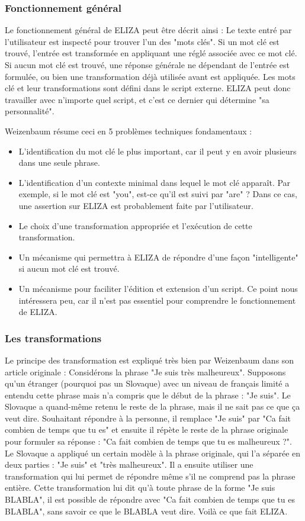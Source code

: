 \documentclass[11pt,a4paper]{report}
\begin{document}
  \subsubsection*{Fonctionnement général}
  Le fonctionnement général de ELIZA peut être décrit ainsi : Le texte entré par l'utilisateur 
  est inspecté pour trouver l'un des "mots clés". Si un mot clé est trouvé, l'entrée est transformée 
  en appliquant une réglé associée avec ce mot clé. Si aucun mot clé est trouvé, une réponse générale 
  ne dépendant de l'entrée est formulée, ou bien une transformation déjà utilisée avant est appliquée. 
  Les mots clé et leur transformations sont défini dans le script externe. ELIZA peut donc travailler 
  avec n'importe quel script, et c'est ce dernier qui détermine "sa personnalité". 

  Weizenbaum résume ceci en 5 problèmes techniques fondamentaux :
  \begin{itemize}
    \item L'identification du mot clé le plus important, car il peut y en avoir plusieurs dans une 
    seule phrase.
    \item L'identification d'un contexte minimal dans lequel le mot clé apparaît. Par exemple, si le 
    mot clé est "you", est-ce qu'il est suivi par "are" ? Dans ce cas, une assertion sur ELIZA est 
    probablement faite par l'utilisateur.
    \item Le choix d'une transformation appropriée et l'exécution de cette transformation. 
    \item Un mécanisme qui permettra à ELIZA de répondre d'une façon "intelligente" si aucun mot 
    clé est trouvé. 
    \item Un mécanisme pour faciliter l'édition et extension d'un script. Ce point nous intéressera peu, 
    car il n'est pas essentiel pour comprendre le fonctionnement de ELIZA. 
  \end{itemize}

  \subsubsection*{Les transformations}
  Le principe des transformation est expliqué très bien par Weizenbaum dans son article originale : 
  Considérons la phrase "Je suis très malheureux". Supposons qu'un étranger (pourquoi pas un Slovaque) avec un niveau de 
  français limité a entendu cette phrase mais n'a compris que le début de la phrase : "Je suis". 
  Le Slovaque a quand-même retenu le reste de la phrase, mais il ne sait pas ce que ça veut dire. 
  Souhaitant répondre à la personne, il remplace "Je suis" par "Ca fait combien de temps que tu es"
  et ensuite il répète le reste de la phrase originale pour formuler sa réponse :
  "Ca fait combien de temps que tu es malheureux ?". Le Slovaque a appliqué un certain modèle
  à la phrase originale, qui l'a séparée en deux parties : "Je suis" et "très malheureux".
  Il a ensuite utiliser une transformation qui lui permet de répondre même s'il ne comprend pas 
  la phrase entière. Cette transformation lui dit qu'à toute phrase de la forme 
  "Je suis BLABLA", il est possible de répondre avec "Ca fait combien de temps que tu es BLABLA", 
  sans savoir ce que le BLABLA veut dire. Voilà ce que fait ELIZA.  
\end{document}
